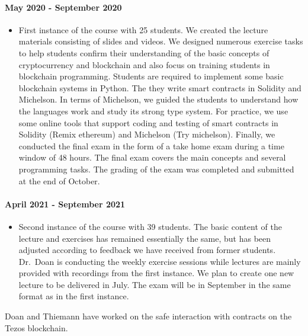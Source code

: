 \documentclass[a4paper,11pt]{article}
\begin{document}
\paragraph{May 2020 - September 2020}
\begin{itemize}
\item First instance of the course with 25 students. We created the lecture materials consisting of slides and videos.  We designed numerous exercise tasks to help students confirm their understanding of the basic concepts of cryptocurrency and blockchain and also focus on training students in blockchain programming. Students are required to implement some basic blockchain systems in  Python. The they write smart contracts in Solidity and Michelson. In terms of Michelson, we guided the students to understand how the languages work and study its strong type system. For practice, we use some online tools that support coding and testing of smart contracts in Solidity (Remix ethereum) and Michelson (Try michelson). Finally, we conducted the final exam in the form of a take home exam during a time window of 48 hours. The final exam covers the main concepts and several programming tasks. The grading of the exam was completed and submitted at the end of October. 
\end{itemize}

\paragraph{April 2021 - September 2021}
\begin{itemize} 
\item Second instance of the course with 39 students. The basic content of the lecture and exercises has remained essentially the same, but has  been adjusted according to feedback we have received from former students. Dr.\ Doan is conducting the weekly exercise sessions while lectures are mainly provided with recordings from the first instance. We plan to create one new lecture to be delivered in July. The exam will be in September in the same format as in the first instance. 
\end{itemize}



Doan and Thiemann have worked on the safe interaction with contracts on the Tezos blockchain.
\end{document}
